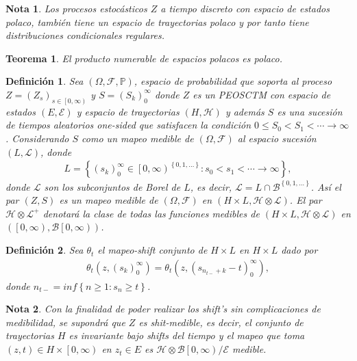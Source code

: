 \documentclass{article}
\newtheorem{Def}{Definición}[section]
\newtheorem{Teo}{Teorema}[section]
\newtheorem{Note}{Nota}[section]
\newcommand{\prob}{\mathbb{P}}
\numberwithin{equation}{section}
\begin{document}
\begin{Note}
Los procesos estoc\'asticos $Z$ a tiempo discreto con espacio de estados polaco, tambi\'en tiene un espacio de trayectorias polaco y por tanto tiene distribuciones condicionales regulares.
\end{Note}

\begin{Teo}
El producto numerable de espacios polacos es polaco.
\end{Teo}


\begin{Def}
Sea $\left(\Omega,\mathcal{F},\prob\right)$, espacio de probabilidad que soporta al proceso $Z=\left(Z_{s}\right)_{s\in\left[0,\infty\right)}$ y $S=\left(S_{k}\right)_{0}^{\infty}$ donde $Z$ es un PEOSCTM con espacio de estados $\left(E,\mathcal{E}\right)$  y espacio de trayectorias $\left(H,\mathcal{H}\right)$  y adem\'as $S$ es una sucesi\'on de tiempos aleatorios one-sided que satisfacen la condici\'on $0\leq S_{0}<S_{1}<\cdots\rightarrow\infty$. Considerando $S$ como un mapeo medible de $\left(\Omega,\mathcal{F}\right)$ al espacio sucesi\'on $\left(L,\mathcal{L}\right)$, donde 
\begin{eqnarray}
L=\left\{\left(s_{k}\right)_{0}^{\infty}\in\left[0,\infty\right)^{\left\{0,1,\ldots\right\}}:s_{0}<s_{1}<\cdots\rightarrow\infty\right\},
\end{eqnarray}
donde $\mathcal{L}$ son los subconjuntos de Borel de $L$, es decir, $\mathcal{L}=L\cap\mathcal{B}^{\left\{0,1,\ldots\right\}}$. As\'i el par $\left(Z,S\right)$ es un mapeo medible de  $\left(\Omega,\mathcal{F}\right)$ en $\left(H\times L,\mathcal{H}\otimes\mathcal{L}\right)$. El par $\mathcal{H}\otimes\mathcal{L}^{+}$ denotar\'a la clase de todas las funciones medibles de $\left(H\times L,\mathcal{H}\otimes\mathcal{L}\right)$ en $\left(\left[0,\infty\right),\mathcal{B}\left[0,\infty\right)\right)$.
\end{Def}


\begin{Def}
Sea $\theta_{t}$ el mapeo-shift conjunto de $H\times L$ en $H\times L$ dado por
\begin{eqnarray}
\theta_{t}\left(z,\left(s_{k}\right)_{0}^{\infty}\right)=\theta_{t}\left(z,\left(s_{n_{t-}+k}-t\right)_{0}^{\infty}\right),
\end{eqnarray}
donde 
$n_{t-}=inf\left\{n\geq1:s_{n}\geq t\right\}$.
\end{Def}

\begin{Note}
Con la finalidad de poder realizar los shift's sin complicaciones de medibilidad, se supondr\'a que $Z$ es shit-medible, es decir, el conjunto de trayectorias $H$ es invariante bajo shifts del tiempo y el mapeo que toma $\left(z,t\right)\in H\times\left[0,\infty\right)$ en $z_{t}\in E$ es $\mathcal{H}\otimes\mathcal{B}\left[0,\infty\right)/\mathcal{E}$ medible.
\end{Note}
\end{document}
